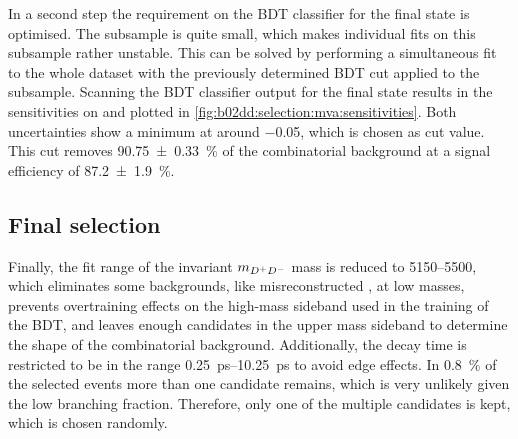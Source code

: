 In a second step the requirement on the BDT classifier for the \KKpiKpipi
final state is optimised. The \KKpiKpipi subsample is quite small, which makes
individual fits on this subsample rather unstable. This can be solved by
performing a simultaneous fit to the whole dataset with the previously
determined BDT cut applied to the \KpipiKpipi subsample. Scanning the BDT
classifier output for the \KKpiKpipi final state results in the sensitivities
on \SDD and \CDD plotted in \cref{fig:b02dd:selection:mva:sensitivities}. Both
uncertainties show a minimum at around \num{-0.05}, which is chosen as cut
value. This cut removes \SI{90.75\pm0.33}{\percent} of the combinatorial
background at a signal efficiency of \SI{87.2\pm1.9}{\percent}.

\subsection{Final selection}
\label{sec:b02dd:selection:final_selection}

Finally, the fit range of the invariant $m_{{{D}^+}{{D}^-}}$ mass is reduced to
\SIrange{5150}{5500}{\MeVcc}, which eliminates some backgrounds, like
misreconstructed \mbox{\BdToDstD}, at low masses, prevents overtraining
effects on the high-mass sideband used in the training of the BDT, and leaves
enough candidates in the upper mass sideband to determine the shape of the
combinatorial background. Additionally, the decay time is restricted to be in
the range \SIrange{0.25}{10.25}{\ps} to avoid edge effects. In
\SI{0.8}{\percent} of the selected events more than one candidate remains,
which is very unlikely given the low branching fraction. Therefore, only one
of the multiple candidates is kept, which is chosen randomly.
